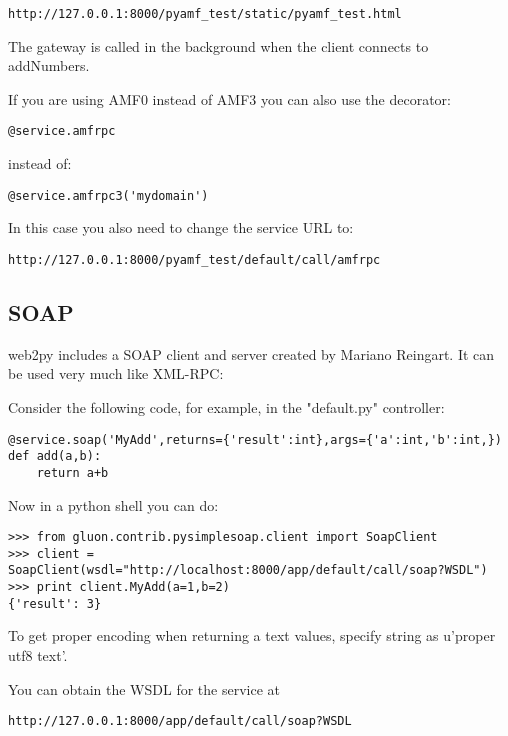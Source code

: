 \documentclass[justified,sixbynine,notoc]{tufte-book}
\def\inxx#1{\index{#1}}
\begin{document}
\begin{fullwidth}
\begin{lstlisting}[keywords={}]
http://127.0.0.1:8000/pyamf_test/static/pyamf_test.html
\end{lstlisting}

The gateway is called in the background when the client connects to addNumbers.

If you are using AMF0 instead of AMF3 you can also use the decorator:
\begin{lstlisting}
@service.amfrpc
\end{lstlisting}
\noindent instead of:
\begin{lstlisting}
@service.amfrpc3('mydomain')
\end{lstlisting}

In this case you also need to change the service URL to:

\begin{lstlisting}[keywords={}]
http://127.0.0.1:8000/pyamf_test/default/call/amfrpc
\end{lstlisting}

\goodbreak\subsection{SOAP}

\inxx{SOAP}
\noindent web2py includes a SOAP client and server created by Mariano Reingart. It can be used very much like XML-RPC:

Consider the following code, for example, in the "default.py" controller:
\begin{lstlisting}
@service.soap('MyAdd',returns={'result':int},args={'a':int,'b':int,})
def add(a,b):
    return a+b
\end{lstlisting}

Now in a python shell you can do:
\begin{lstlisting}
>>> from gluon.contrib.pysimplesoap.client import SoapClient
>>> client = SoapClient(wsdl="http://localhost:8000/app/default/call/soap?WSDL")
>>> print client.MyAdd(a=1,b=2)
{'result': 3}
\end{lstlisting}

To get proper encoding when returning a text values, specify string as u'proper utf8 text'.

You can obtain the WSDL for the service at

\begin{lstlisting}[keywords={}]
http://127.0.0.1:8000/app/default/call/soap?WSDL
\end{lstlisting}


\end{fullwidth}
\end{document}
